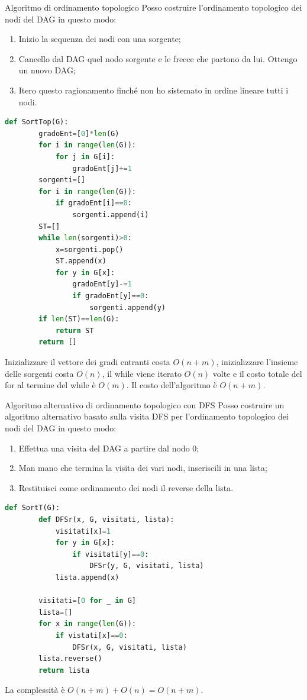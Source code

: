 \begin{Algoritmo}{Algoritmo di ordinamento topologico}{}
    Posso costruire l'ordinamento topologico dei nodi del DAG in questo modo:
    \begin{enumerate}
        \item Inizio la sequenza dei nodi con una sorgente;
        \item Cancello dal DAG quel nodo sorgente e le frecce che partono da lui. Ottengo un nuovo DAG;
        \item Itero questo ragionamento finché non ho sistemato in ordine lineare tutti i nodi. 
    \end{enumerate}

    \begin{lstlisting}[language=Python]
    def SortTop(G):
        gradoEnt=[0]*len(G)
        for i in range(len(G)):
            for j in G[i]:
                gradoEnt[j]+=1
        sorgenti=[]
        for i in range(len(G)):
            if gradoEnt[i]==0:
                sorgenti.append(i)
        ST=[]
        while len(sorgenti)>0:
            x=sorgenti.pop()
            ST.append(x)
            for y in G[x]:
                gradoEnt[y]-=1
                if gradoEnt[y]==0:
                    sorgenti.append(y)
        if len(ST)==len(G):
            return ST
        return []
    \end{lstlisting}
    Inizializzare il vettore dei gradi entranti costa $O(n + m)$, inizializzare l'insieme delle sorgenti costa $O(n)$, il while viene iterato $O(n)$ volte e il costo totale del for al termine del while è $O(m)$. Il costo dell'algoritmo è $O(n + m)$.
\end{Algoritmo}

\begin{Algoritmo}{Algoritmo alternativo di ordinamento topologico con DFS}{}
    Posso costruire un algoritmo alternativo basato sulla visita DFS per l'ordinamento topologico dei nodi del DAG in questo modo:
    \begin{enumerate}
        \item Effettua una visita del DAG a partire dal nodo 0;
        \item Man mano che termina la visita dei vari nodi, inseriscili in una lista;
        \item Restituisci come ordinamento dei nodi il reverse della lista.
    \end{enumerate}

    \begin{lstlisting}[language=Python]
    def SortT(G):
        def DFSr(x, G, visitati, lista):
            visitati[x]=1
            for y in G[x]:
                if visitati[y]==0:
                    DFSr(y, G, visitati, lista)
            lista.append(x)

        visitati=[0 for _ in G]
        lista=[]
        for x in range(len(G)):
            if vistati[x]==0:
                DFSr(x, G, visitati, lista)
        lista.reverse()
        return lista
    \end{lstlisting}
    La complessità è $O(n+m)+O(n)=O(n+m)$.
\end{Algoritmo}


